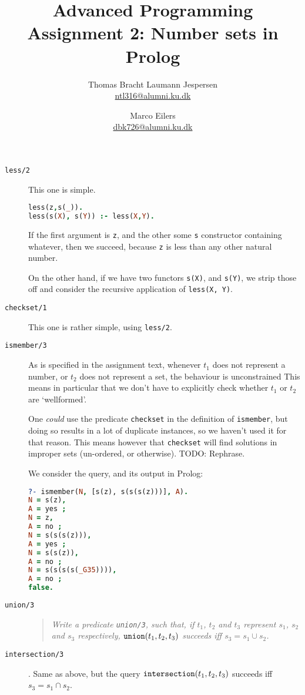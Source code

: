 \documentclass[a4paper]{article}
\title{Advanced Programming\\ Assignment 2: Number sets in Prolog}
\author{Thomas Bracht Laumann Jespersen\\ \url{ntl316@alumni.ku.dk} \and Marco Eilers\\ \url{dbk726@alumni.ku.dk} }
\newcommand{\pfunc}[1]{\textnormal{\texttt{#1}}\xspace}
\newcommand{\pfuncn}[2]{\textnormal{\texttt{#1/#2}}\xspace}
\begin{document}
\maketitle

\begin{description}
\item[\pfuncn{less}{2}] This one is simple.
\begin{lstlisting}[language=prolog]
less(z,s(_)).
less(s(X), s(Y)) :- less(X,Y).
\end{lstlisting}
If the first argument is \texttt{z}, and the other some \texttt{s} constructor containing whatever, then we succeed, because \texttt{z} is less than any other natural number.

On the other hand, if we have two functors \texttt{s(X)}, and \texttt{s(Y)}, we strip those off and consider the recursive application of \texttt{less(X, Y)}.
\item[\pfuncn{checkset}{1}] This one is rather simple, using \pfuncn{less}{2}.
\item[\pfuncn{ismember}{3}] As is specified in the assignment text, whenever $t_1$ does not represent a number, or $t_2$ does not represent a set, the behaviour is unconstrained %
  This means in particular that we don't have to explicitly check whether $t_1$ or $t_2$ are `wellformed'.

  One \emph{could} use the predicate \pfunc{checkset} in the definition of \pfunc{ismember}, but doing so results in a lot of duplicate instances, so we haven't used it for that reason. This means however that \pfunc{checkset} will find solutions in improper sets (un-ordered, or otherwise). TODO: Rephrase.

  We consider the query, and its output in Prolog:
\begin{lstlisting}[language=prolog]
?- ismember(N, [s(z), s(s(s(z)))], A).
N = s(z),
A = yes ;
N = z,
A = no ;
N = s(s(s(z))),
A = yes ;
N = s(s(z)),
A = no ;
N = s(s(s(s(_G35)))),
A = no ;
false.
\end{lstlisting}
\item[\pfuncn{union}{3}]\hfill
  \begin{quotation}\itshape
    Write a predicate \pfuncn{union}{3}, such that, if $t_1$, $t_2$ and $t_3$ represent $s_1$, $s_2$ and $s_3$ respectively, $\pfunc{union}(t_1, t_2, t_3)$ succeeds iff $s_3 = s_1 \cup s_2$.
  \end{quotation}
\item[\pfuncn{intersection}{3}]. Same as above, but the query $\pfunc{intersection}(t_1,t_2,t_3)$ succeeds iff $s_3 = s_1 \cap s_2$.
\end{description}
\end{document}
